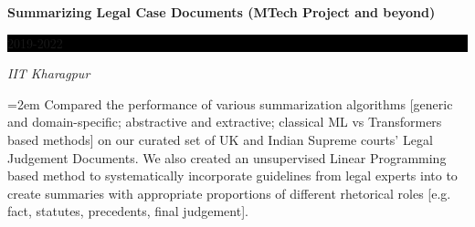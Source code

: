 \documentclass[paper=a4,fontsize=10pt]{scrartcl} %
\newcommand{\sepspace}{\vspace*{0.6em}}		%
\newcommand{\NewPart}[1]{\section*{\uppercase{#1}}}
\newcommand{\EducationEntry}[4]{
		\noindent \textbf{#1} \hfill      %
		\colorbox{Black}{%
			\parbox{6em}{%
			\hfill\color{White}#2}} \par  %
		\noindent \textit{#3} \par        %
		\noindent\hangindent=2em\hangafter=0 \small #4 %
		\normalsize \par}
\begin{document}
{%

\EducationEntry{Summarizing Legal Case Documents (MTech Project and beyond)}{2019-2022}{IIT Kharagpur}{Compared the performance of various summarization algorithms [generic and domain-specific; abstractive and extractive; classical ML vs Transformers based methods] on our curated set of UK and Indian Supreme courts' Legal Judgement Documents. We also created an unsupervised Linear Programming based method to systematically incorporate guidelines from legal experts into to create summaries with appropriate proportions of different rhetorical roles [e.g. fact, statutes, precedents, final judgement].
}

\sepspace













}
\end{document}
